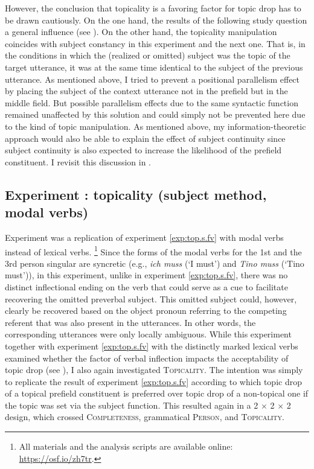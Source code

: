 However, the conclusion that topicality is a favoring factor for topic drop has to be drawn cautiously.
On the one hand, the results of the following study question a general influence (see ).
On the other hand, the topicality manipulation coincides with subject constancy in this experiment and the next one.
That is, in the conditions in which the (realized or omitted) subject was the topic of the target utterance, it was at the same time identical to the subject of the previous utterance.
As mentioned above, I tried to prevent a positional parallelism effect by placing the subject of the context utterance not in the prefield but in the middle field.
But possible parallelism effects due to the same syntactic function remained unaffected by this solution and could simply not be prevented here due to the kind of topic manipulation.
As mentioned above, my information-theoretic approach would also be able to explain the effect of subject continuity since subject continuity is also expected to increase the likelihood of the prefield constituent.
I revisit this discussion in . 

\largerpage
{}\label{exp:top.s.mv}
\subsection{Experiment : topicality (subject method, modal verbs) }
\label{sec:exp.top.s.mv}
Experiment  was a replication of experiment \ref*{exp:top.s.fv} with modal verbs  instead of lexical verbs.%
\footnote{All materials and the analysis scripts are available online: \url{https://osf.io/zh7tr}.}
%
Since the forms of the modal verbs  for the 1st and the 3rd person singular are syncretic  (e.g., \textit{ich muss} (`I must') and \textit{Tino muss} (`Tino must')), in this experiment, unlike in experiment \ref*{exp:top.s.fv}, there was no distinct inflectional ending on the verb that could serve as a cue to facilitate recovering the omitted preverbal subject. 
This omitted subject could, however, clearly be recovered based on the object pronoun referring to the competing referent that was also present in the utterances.
In other words, the corresponding utterances were only locally ambiguous. 
While this experiment together with experiment \ref*{exp:top.s.fv} with the distinctly marked lexical verbs examined whether the factor of verbal inflection impacts the acceptability of topic drop (see ), I also again investigated \textsc{Topicality}.
The intention was simply to replicate the result of experiment \ref*{exp:top.s.fv} according to which topic drop of a topical prefield constituent is preferred over topic drop of a non-topical one if the topic was set via the subject function.
This resulted again in a 2 $\times$ 2 $\times$ 2 design, which crossed  \textsc{Completeness}, grammatical \textsc{Person}, and \textsc{Topicality}.

